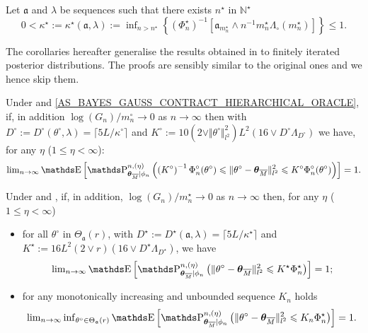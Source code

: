\begin{as}\label{AS_BAYES_GAUSS_CONTRACT_HIERARCHICAL_MINIMAX}
Let $\mathfrak{a}$ and $\lambda$ be sequences such that there exists $n^{\star}$ in $\mathds{N}^{\star}$
\[0 < \kappa^{\star} := \kappa^{\star}(\mathfrak{a}, \lambda) := \inf\nolimits_{n > n^{\star}} \left\{\left(\Phi_{n}^{\star}\right)^{-1}\left[\mathfrak{a}_{m_{n}^{\star}} \wedge n^{-1} m_{n}^{\star} \Lambda_{\circ}(m_{n}^{\star}) \right]\right\} \leq 1.\]
\end{as}

The corollaries hereafter generalise the results obtained in  to finitely iterated posterior distributions.
The proofs are sensibly similar to the original ones and we hence skip them.

\begin{cor}\label{COR_BAYES_GAUSS_CONTRACT_HIERARCHICAL_ORACLE}
Under  and \textsc{\cref{AS_BAYES_GAUSS_CONTRACT_HIERARCHICAL_ORACLE}}, if, in addition $\log(G_{n})/m_{n}^{\circ} \rightarrow 0$ as $n \rightarrow \infty$ then with $D^{\circ} := D^{\circ}(\theta^{\circ}, \lambda) = \lceil 5 L/\kappa^{\circ} \rceil$ and $K^{\circ} := 10(2 \vee \Vert \theta^{\circ} \Vert_{l^{2}}^{2})L^{2}(16 \vee D^{\circ} \Lambda_{D^{\circ}})$ we have, for any $\eta$ ($1 \leq \eta < \infty$):
\[\lim\nolimits_{n \rightarrow \infty} \E\left[\P_{\boldsymbol{\theta}_{\overline{M}} \vert \phi_{n}}^{n, (\eta)} \left(\left(K^{\circ}\right)^{-1} \Phi_{n}^{\circ}(\theta^{\circ}) \leq \Vert \theta^{\circ} - \boldsymbol{\theta}_{\overline{M}} \Vert_{l^{2}}^{2} \leq K^{\circ} \Phi_{n}^{\circ}(\theta^{\circ})\right)\right] = 1.\]
\reEnd
\end{cor}

\begin{cor}\label{COR_BAYES_GAUSS_CONTRACT_HIERARCHICAL_MINIMAX}
Under  and , if, in addition, $\log(G_{n})/m_{n}^{\star} \rightarrow 0$ as $n \rightarrow \infty$ then, for any $\eta$ ($1 \leq \eta < \infty$)
\begin{itemize}
\item for all $\theta^{\circ}$ in $\Theta_{\mathfrak{a}}(r)$, with $D^{\star} := D^{\star}(\mathfrak{a}, \lambda) = \lceil 5 L/\kappa^{\star} \rceil$ and $K^{\star} := 16 L^{2} (2 \vee r)(16 \vee D^{\star} \Lambda_{D^{\star}})$, we have
\[\lim\nolimits_{n \rightarrow \infty} \E\left[\P_{\boldsymbol{\theta}_{\overline{M}} \vert \phi_{n}}^{n, (\eta)}\left(\Vert \theta^{\circ} - \boldsymbol{\theta}_{\overline{M}} \Vert_{l^{2}}^{2} \leq K^{\star} \Phi_{n}^{\star}\right)\right] =1;\]
\item for any monotonically increasing and unbounded sequence $K_{n}$ holds
\[\lim\nolimits_{n \rightarrow \infty} \inf\nolimits_{\theta^{\circ} \in \Theta_{\mathfrak{a}}(r)} \E\left[\P_{\boldsymbol{\theta}_{\overline{M}} \vert \phi_{n}}^{n, (\eta)}\left(\Vert \theta^{\circ} - \boldsymbol{\theta}_{\overline{M}} \Vert_{l^{2}}^{2} \leq K_{n} \Phi_{n}^{\star}\right)\right] =1.\]
\end{itemize}
\reEnd
\end{cor}

